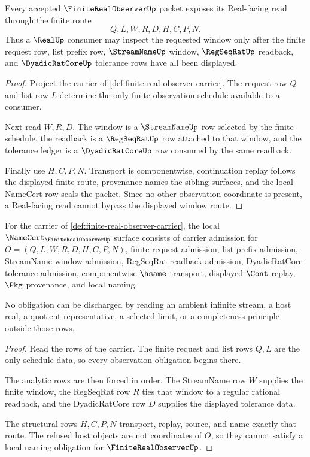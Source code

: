 \begin{theorem}
\label{thm:finite-real-observer-window-soundness}
Every accepted $\FiniteRealObserverUp$ packet exposes its Real-facing read through the finite route
$$
Q,L,W,R,D,H,C,P,N.
$$
Thus a $\RealUp$ consumer may inspect the requested window only after the finite request row, list prefix row, $\StreamNameUp$ window, $\RegSeqRatUp$ readback, and $\DyadicRatCoreUp$ tolerance rows have all been displayed.
\end{theorem}
\begin{proof}
Project the carrier of \autoref{def:finite-real-observer-carrier}. The request row $Q$ and list row $L$ determine the only finite observation schedule available to a consumer.

Next read $W,R,D$. The window is a $\StreamNameUp$ row selected by the finite schedule, the readback is a $\RegSeqRatUp$ row attached to that window, and the tolerance ledger is a $\DyadicRatCoreUp$ row consumed by the same readback.

Finally use $H,C,P,N$. Transport is componentwise, continuation replay follows the displayed finite route, provenance names the sibling surfaces, and the local NameCert row seals the packet. Since no other observation coordinate is present, a Real-facing read cannot bypass the displayed window route.
\end{proof}

\begin{theorem}
\label{thm:finite-real-observer-namecert-obligations}
For the carrier of \autoref{def:finite-real-observer-carrier}, the local $\NameCert_{\FiniteRealObserverUp}$ surface consists of carrier admission for $O=(Q,L,W,R,D,H,C,P,N)$, finite request admission, list prefix admission, StreamName window admission, RegSeqRat readback admission, DyadicRatCore tolerance admission, componentwise $\hsame$ transport, displayed $\Cont$ replay, $\Pkg$ provenance, and local naming.

No obligation can be discharged by reading an ambient infinite stream, a host real, a quotient representative, a selected limit, or a completeness principle outside those rows.
\end{theorem}
\begin{proof}
Read the rows of the carrier. The finite request and list rows $Q,L$ are the only schedule data, so every observation obligation begins there.

The analytic rows are then forced in order. The StreamName row $W$ supplies the finite window, the RegSeqRat row $R$ ties that window to a regular rational readback, and the DyadicRatCore row $D$ supplies the displayed tolerance data.

The structural rows $H,C,P,N$ transport, replay, source, and name exactly that route. The refused host objects are not coordinates of $O$, so they cannot satisfy a local naming obligation for $\FiniteRealObserverUp$.
\end{proof}

